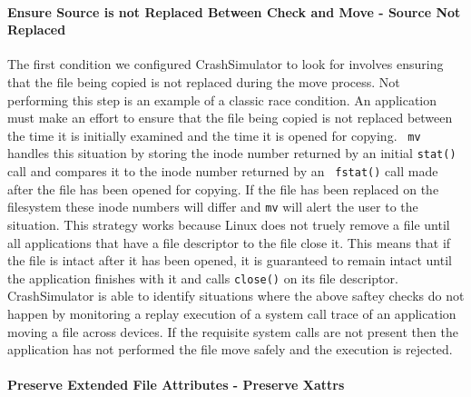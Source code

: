 %

\paragraph{Ensure Source is not Replaced Between Check and Move - Source Not Replaced}

The first condition we configured CrashSimulator to look for involves ensuring
that the file being copied is not replaced during the move process. Not
performing this step is an example of a classic race condition.  An application
must make an effort to ensure that the file being copied is not replaced between
the time it is initially examined and the time it is opened for copying.  {\tt
  mv} handles this situation by storing the inode number returned by an initial
{\tt stat()} call and compares it to the inode number returned by an {\tt
  fstat()} call made after the file has been opened for copying.  If the file
has been replaced on the filesystem these inode numbers will differ and {\tt mv}
will alert the user to the situation.  This strategy works because Linux does
not truely remove a file until all applications that have a file descriptor to
the file close it.  This means that if the file is intact after it has been
opened, it is guaranteed to remain intact until the application finishes with it
and calls {\tt close()} on its file descriptor. CrashSimulator is able to
identify situations where the above saftey checks do not happen by monitoring a
replay execution of a system call trace of an application moving a file across
devices.  If the requisite system calls are not present then the application has
not performed the file move safely and the execution is rejected.

\paragraph{Preserve Extended File Attributes - Preserve Xattrs}


